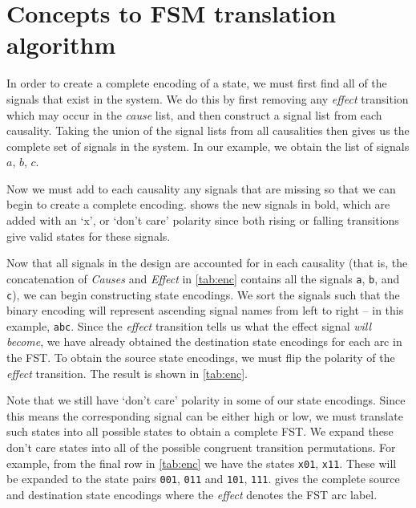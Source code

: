 \section{Concepts to FSM translation algorithm}\label{sec:algorithm}

In order to create a complete encoding of a state, we must first find all of the signals that exist in the system.
We do this by first removing any \emph{effect} transition which may occur in the \emph{cause} list, and then construct a signal list from each causality.
Taking the union of the signal lists from all causalities then gives us the complete set of signals in the system.
In our example, we obtain the list of signals $a$, $b$, $c$.

Now we must add to each causality any signals that are missing so that we can begin to create a complete encoding.
 shows the new signals in bold, which are added with an `x', or `don't care' polarity since both rising or falling transitions give valid states for these signals.

Now that all signals in the design are accounted for in each causality (that is, the concatenation of \emph{Causes} and \emph{Effect} in \cref{tab:enc} contains all the signals \texttt{a}, \texttt{b}, and \texttt{c}), we can begin constructing state encodings.
We sort the signals such that the binary encoding will represent ascending signal names from left to right -- in this example, \texttt{abc}.
Since the \emph{effect} transition tells us what the effect signal \emph{will become}, we have already obtained the destination state encodings for each arc in the FST\@.
To obtain the source state encodings, we must flip the polarity of the \emph{effect} transition.
The result is shown in \cref{tab:enc}.

Note that we still have `don't care' polarity in some of our state encodings.
Since this means the corresponding signal can be either high or low, we must translate such states into all possible states to obtain a complete FST\@.
We expand these don't care states into all of the possible congruent transition permutations.
For example, from the final row in \cref{tab:enc} we have the states \texttt{x01}, \texttt{x11}.
These will be expanded to the state pairs \texttt{001}, \texttt{011} and \texttt{101}, \texttt{111}.
 gives the complete source and destination state encodings where the \emph{effect} denotes the FST arc label.

